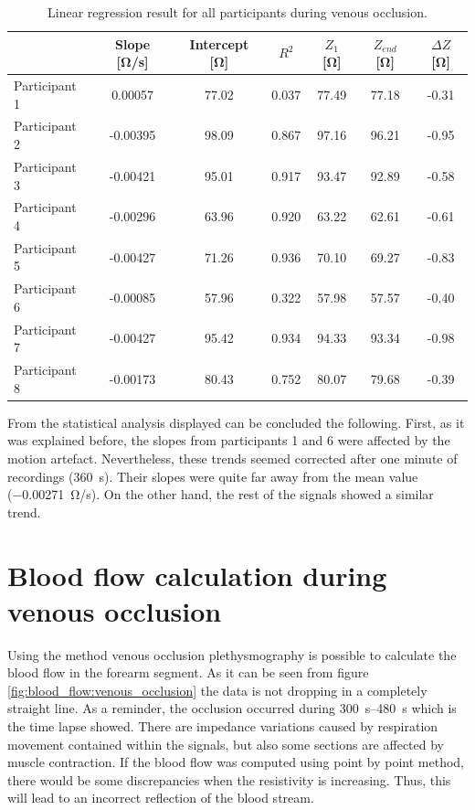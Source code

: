 \begin{table}
	\caption{Linear regression result for all participants during venous occlusion.}
	\label{tbl:venous_occlusion:region2}
	\centering
	\begin{tabu}{lcccccc}
		\toprule
		              & \textbf{Slope [\si{\ohm/\second}]} & \textbf{Intercept [\si{\ohm}]} & \textbf{$R^2$} & \textbf{$Z_1$ [\si{\ohm}]} & \textbf{$Z_{end}$ [\si{\ohm}]} & \textbf{ $\Delta Z$ [\si{\ohm}]} \\ \midrule
		Participant 1  &   0.00057  &  77.02   &     0.037  &  77.49  &  77.18  &  -0.31\\
		Participant 2  &  -0.00395  &  98.09   &     0.867  &  97.16  &  96.21  &  -0.95\\
		Participant 3  &  -0.00421  &  95.01   &     0.917  &  93.47  &  92.89  &  -0.58\\
		Participant 4  &  -0.00296  &  63.96   &     0.920  &  63.22  &  62.61  &  -0.61\\
		Participant 5  &  -0.00427  &  71.26   &     0.936  &  70.10  &  69.27  &  -0.83\\
		Participant 6  &  -0.00085  &  57.96   &     0.322  &  57.98  &  57.57  &  -0.40\\
		Participant 7  &  -0.00427  &  95.42   &     0.934  &  94.33  &  93.34  &  -0.98\\
		Participant 8  &  -0.00173  &  80.43   &     0.752  &  80.07  &  79.68  &  -0.39\\ \bottomrule
	\end{tabu} 
\end{table}

From the statistical analysis displayed can be concluded the following. First, as it was explained before, the slopes from participants 1 and 6 were affected by the motion artefact. Nevertheless, these trends seemed corrected after one minute of recordings (\SI{360}{\second}). Their slopes were quite far away from the mean value (\SI{-0.00271}{\ohm / \second}). On the other hand, the rest of the signals showed a similar trend. 

\section{Blood flow calculation during venous occlusion}
\label{section5.2}
Using the method venous occlusion plethysmography is possible to calculate the blood flow in the forearm segment. As it can be seen from figure \ref{fig:blood_flow:venous_occlusion} the data is not dropping in a completely straight line. As a reminder, the occlusion occurred during \SIrange{300}{480}{\second} which is the time lapse showed. There are impedance variations caused by respiration movement contained within the signals, but also some sections are affected by muscle contraction. If the blood flow was computed using point by point method, there would be some discrepancies when the resistivity is increasing. Thus, this will lead to an incorrect reflection of the blood stream. 

